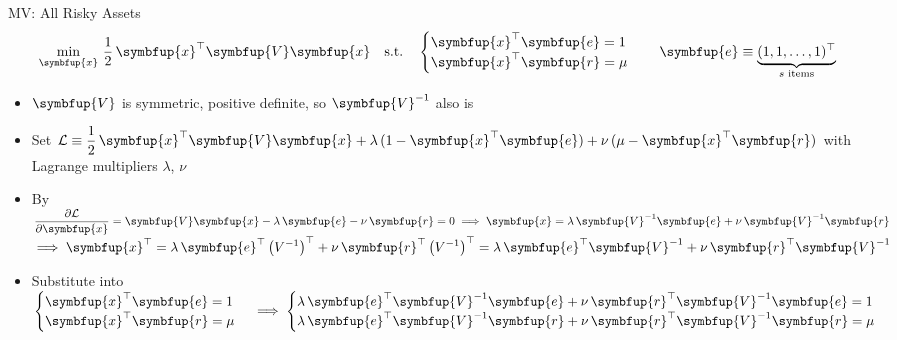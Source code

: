 \documentclass[10pt,handout]{beamer}
\newcommand{\ds}{\displaystyle}
\newcommand{\ie}{\;\Longrightarrow\;}
\newcommand{\vx}{\symbfup{x}}
\newcommand{\vV}{\symbfup{V}}
\newcommand{\ve}{\symbfup{e}}
\newcommand{\vr}{\symbfup{r}}
\theoremstyle{definition}
\begin{document}
\begin{frame}{MV: All Risky Assets}
  \begin{align*}
    \min_{\vx}\,\frac{1}{2}\,\vx^\top\vV\vx\quad\text{s.t.}\quad\begin{cases}\vx^\top\ve = 1 \\\vx^\top\vr = \mu\end{cases}\quad \ve\equiv\underbrace{(1, 1, \ldots, 1)^\top}_{\text{$s$ items}}
  \end{align*}
  \onslide<+->
  \begin{itemize}[<+->]
    \item $\vV$ is symmetric, positive definite, so $\vV^{-1}$ also is
    \item Set $\ds\mathcal{L}\equiv\frac{1}{2}\,\vx^\top\vV\vx + \lambda\,(1 - \vx^\top\ve) + \nu\,(\mu - \vx^\top\vr)$ with Lagrange multipliers $\lambda$, $\nu$
    \item By $\ds\frac{\partial\mathcal{L}}{\partial\vx} = \vV\vx - \lambda\,\ve - \nu\,\vr = 0\ie\vx = \lambda\,\vV^{-1}\ve + \nu\,\vV^{-1}\vr$ $\ds\ie\vx^\top = \lambda\,\ve^\top\left(V^{-1}\right)^\top + \nu\,\vr^\top\left(V^{-1}\right)^\top = \lambda\,\ve^\top\vV^{-1} + \nu\,\vr^\top\vV^{-1}$ 
    \item Substitute into $\ds\begin{cases}\vx^\top\ve = 1 \\\vx^\top\vr = \mu\end{cases}\ie\begin{cases}\lambda\,\ve^\top\vV^{-1}\ve + \nu\,\vr^\top\vV^{-1}\ve = 1 \\ \lambda\,\ve^\top\vV^{-1}\vr + \nu\,\vr^\top\vV^{-1}\vr = \mu\end{cases}$
  \end{itemize}
\end{frame}
\end{document}
